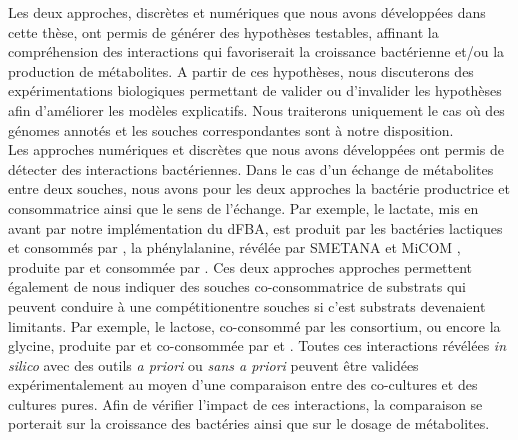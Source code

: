 \documentclass[../main.tex]{subfiles}
\begin{document}
Les deux approches, discrètes et numériques que nous avons développées dans cette thèse, ont permis de générer des hypothèses testables, affinant la compréhension des interactions qui favoriserait la croissance bactérienne et/ou la production de métabolites. A partir de ces hypothèses, nous discuterons des expérimentations biologiques permettant de valider ou d'invalider les hypothèses afin d'améliorer les modèles explicatifs. Nous traiterons uniquement le cas où des génomes annotés et les souches correspondantes sont à notre disposition. \\


Les approches numériques et discrètes que nous avons développées ont permis de détecter des interactions bactériennes. Dans le cas d'un échange de métabolites entre deux souches, nous avons pour les deux approches la bactérie productrice et consommatrice ainsi que le sens de l'échange. Par exemple, le lactate, mis en avant par notre implémentation du dFBA, est produit par les bactéries lactiques et consommés par \freud, la phénylalanine, révélée par SMETANA \citep{Zelezniak2015} et MiCOM \citep{diener2020}, produite par \plantarum et consommée par \freud. Ces deux approches approches permettent également de nous indiquer des souches co-consommatrice de substrats qui peuvent conduire à une compétitionentre souches si c'est substrats devenaient limitants. Par exemple, le lactose, co-consommé par les consortium, ou encore la glycine, produite par \plantarum et co-consommée par \lactis et \freud. Toutes ces interactions révélées \textit{in silico} avec des outils \textit{a priori} ou \textit{sans a priori} peuvent être validées expérimentalement au moyen d'une comparaison entre des co-cultures et des cultures pures. Afin de vérifier l'impact de ces interactions, la comparaison se porterait sur la croissance des bactéries ainsi que sur le dosage de métabolites.
\end{document}
